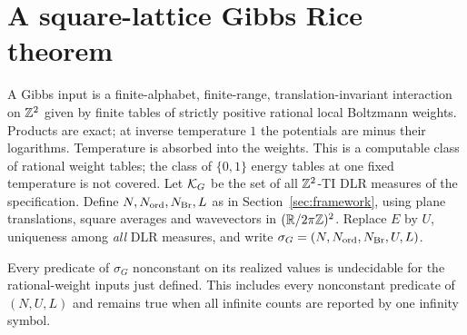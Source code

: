 \section{A square-lattice Gibbs Rice theorem}\label{sec:line-gibbs}
A Gibbs input is a finite-alphabet, finite-range, translation-invariant
interaction on $\mathbb Z^2$ given by finite tables of strictly positive
rational local Boltzmann weights. Products are exact; at inverse
temperature $1$ the potentials are minus their logarithms.
Temperature is absorbed into the weights. This is a computable class
of rational weight tables; the class of $\{0,1\}$ energy tables at
one fixed temperature is not covered.
Let $\mathcal K_G$ be the set of all $\mathbb Z^2$-TI DLR measures of the specification.
Define $N,N_{\mathrm{ord}},N_{\mathrm{Br}},L$ as in Section~\ref{sec:framework}, using
plane translations, square averages and wavevectors in
$(\mathbb R/2\pi\mathbb Z)^2$. Replace $E$ by $U$, uniqueness among \emph{all} DLR
measures, and write $\sigma_G=(N,N_{\mathrm{ord}},N_{\mathrm{Br}},U,L)$.

\begin{theorem}\label{thm:line-gibbs}
Every predicate of $\sigma_G$ nonconstant on its realized values is
undecidable for the rational-weight inputs just defined. This includes
every nonconstant predicate of $(N,U,L)$ and remains true when all
infinite counts are reported by one infinity symbol.
\end{theorem}

